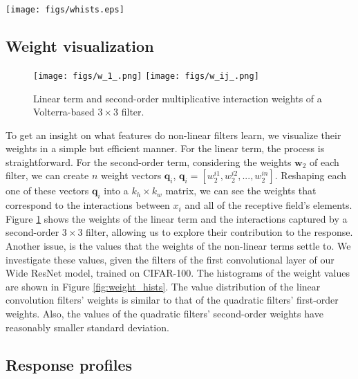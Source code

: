\documentclass[10pt,twocolumn,letterpaper]{article}
\renewcommand{\vec}[1]{\mathbf{#1}}
\begin{document}
\begin{figure*}[!ht]
  \centering
  \texttt{[image: figs/whists.eps]}
\caption{Weight values of linear convolution filter weights (left), Volterra-based convolution first-order weights (middle) and Volterra-based convolution second-order weights (right).}
\label{fig:weight_hists}
\end{figure*}


\subsection{Weight visualization}
\begin{figure}[!hb]
\hspace{-0.41cm}
\centering
  \texttt{[image: figs/w\_1\_.png]}
\endminipage\hfill
{}
  \texttt{[image: figs/w\_ij\_.png]}
\endminipage
\caption{Linear term and second-order multiplicative interaction weights of a Volterra-based $3\times3$ filter.}\label{fig:Volt_kern_vis}
\end{figure}	  
    To get an insight on what features do non-linear filters learn, we visualize their weights in a simple but efficient manner. For the linear term, the process is straightforward. For the second-order term, considering the weights $\vec{w}_2$ of each filter, we can create $n$ weight vectors $\vec{q}_i$, $\vec{q}_i=[w_2^{i1}, w_2^{i2}, ..., w_2^{in}]$. Reshaping each one of these vectors $\vec{q}_i$ into a $k_h \times k_w$ matrix, we can see the weights that correspond to the interactions between $x_i$ and all of the receptive field's elements. Figure \ref{fig:Volt_kern_vis} shows the weights of the linear term and the interactions captured by a second-order $3\times3$ filter, allowing us to explore their contribution to the response.
    Another issue, is the values that the weights of the non-linear terms settle to. We investigate these values, given the filters of the first convolutional layer of our Wide ResNet model, trained on CIFAR-100. The histograms of the weight values are shown in Figure \ref{fig:weight_hists}. The value distribution of the linear convolution filters' weights is similar to that of the quadratic filters' first-order weights. Also, the values of the quadratic filters' second-order weights have reasonably smaller standard deviation. 


\subsection{Response profiles}
\end{document}
